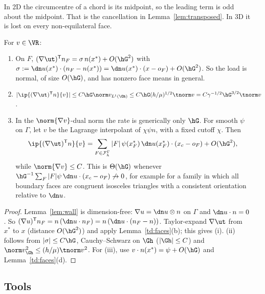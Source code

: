In 2D the circumcentre of a chord is its midpoint, so the leading term is odd about the midpoint. That is the cancellation in Lemma~\ref{lem:transposed}. In 3D it is lost on every non-equilateral face.

\begin{proposition}\label{td:transposed}
For $v\in\VR$:
\begin{enumerate}[label=(\roman*)]
\item On $F$, $(\nabla\ut)^{\mathsf T}n_F=\sigma\,n(x^\ast)+O(\hG^2)$ with $\sigma:=\dn u(x^\ast)\cdot(n_F-n(x^\ast))=\dn u(x^\ast)\cdot(x-o_F)+O(\hG^2)$. So the load is normal, of size $O(\hG)$, and has nonzero face means in general.
\item $|\ip{(\nabla\ut)^{\mathsf T}n}{v}|\le C\hG\norm v_{L^1(\Gh)}\le C\hG(h/\mu)^{1/2}\tnorm v=C\gamma^{-1/2}\hG^{3/2}\tnorm v$.
\item In the $\norm{\nabla v}$-dual norm the rate is generically only $\hG$. For smooth $\psi$ on $\Gamma$, let $v$ be the Lagrange interpolant of $\chi\psi n$, with a fixed cutoff $\chi$. Then
\[
\ip{(\nabla\ut)^{\mathsf T}n}{v}=\sum_{F\in\FG}|F|\,\psi(x_F^\ast)\,\dn u(x_F^\ast)\cdot(x_c-o_F)+O(\hG^2),
\]
while $\norm{\nabla v}\le C$. This is $\Theta(\hG)$ whenever $\hG^{-1}\sum_F|F|\psi\,\dn u\cdot(x_c-o_F)\not\to0$, for example for a family in which all boundary faces are congruent isosceles triangles with a consistent orientation relative to $\dn u$.
\end{enumerate}
\end{proposition}

\begin{proof}
Lemma~\ref{lem:wall} is dimension-free: $\nabla u=\dn u\otimes n$ on $\Gamma$ and $\dn u\cdot n=0$. So $(\nabla u)^{\mathsf T}n_F=n\,(\dn u\cdot n_F)=n\,(\dn u\cdot(n_F-n))$. Taylor-expand $\nabla\ut$ from $x^\ast$ to $x$ (distance $O(\hG^2)$) and apply Lemma~\ref{td:faces}(b); this gives (i). (ii) follows from $|\sigma|\le C\hG$, Cauchy--Schwarz on $\Gh$ ($|\Gh|\le C$) and $\norm v^2_{\Gh}\le(h/\mu)\tnorm v^2$. For (iii), use $v\cdot n(x^\ast)=\psi+O(\hG)$ and Lemma~\ref{td:faces}(d).
\end{proof}

\subsection{Tools}

